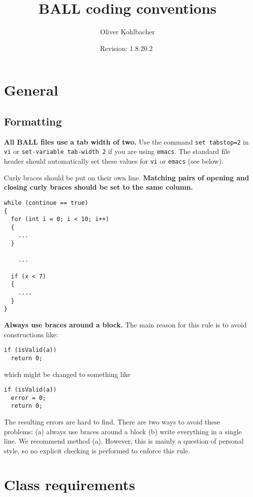 \documentclass[a4paper,10pt]{article}
\title{BALL coding conventions}
\author{Oliver Kohlbacher}
\date{$ $Revision: 1.8.20.2 $ $}
\begin{document}
\maketitle

\section{General}

\subsection{Formatting}

{\bf All BALL files use a tab width of two.} Use the command {\tt set tabstop=2} in
{\tt vi} or {\tt set-variable tab-width 2} if you are using {\tt emacs}. The
standard file header should automatically set these values for {\tt vi} or
{\tt emacs} (see below).

\noindent
Curly braces should be put on their own line. {\bf Matching pairs of opening and closing curly braces should be 
set to the same column. }

\begin{verbatim}
while (continue == true)
{
  for (int i = 0; i < 10; i++)
  {
    ...
  }

 	...

  if (x < 7)
  {
    ....
  }
}
\end{verbatim}

\noindent
{\bf Always use braces around a block.} The main reason for this rule is to avoid constructions like:

\begin{verbatim}
if (isValid(a))
  return 0;
\end{verbatim}

\noindent
which might be changed to something like

\begin{verbatim}
if (isValid(a))
  error = 0;
  return 0;
\end{verbatim}

\noindent
The resulting errors are hard to find. There are two ways to avoid these
problems: (a) always use braces around a block (b) write everything in a single
line. We recommend method (a).
However, this is mainly a question of personal style, so no explicit checking
is performed to enforce this rule.



\section{Class requirements}
\end{document}
